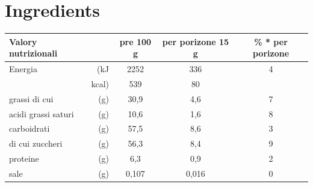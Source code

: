 \documentclass{article}
\begin{document}
\section{Ingredients}
\begin{tabular}{lr|c|c|c}
    \toprule
    Valory nutrizionali &     & pre 100 g & per porizone 15 g & \% * per porizone \\\midrule
    Energia             & (kJ & 2252      & 336               & 4 \\
                        & kcal)& 539      & 80                &   \\\midrule
    grassi di cui       & (g) & 30,9      & 4,6               & 7 \\
    acidi grassi saturi & (g) & 10,6      & 1,6               & 8 \\\midrule
    carboidrati         & (g) & 57,5      & 8,6               & 3 \\
    di cui zuccheri     & (g) & 56,3      & 8,4               & 9 \\\midrule
    proteine            & (g) & 6,3       & 0,9               & 2 \\\midrule
    sale                & (g) & 0,107     & 0,016             & 0 \\\bottomrule
\end{tabular}
\end{document}
